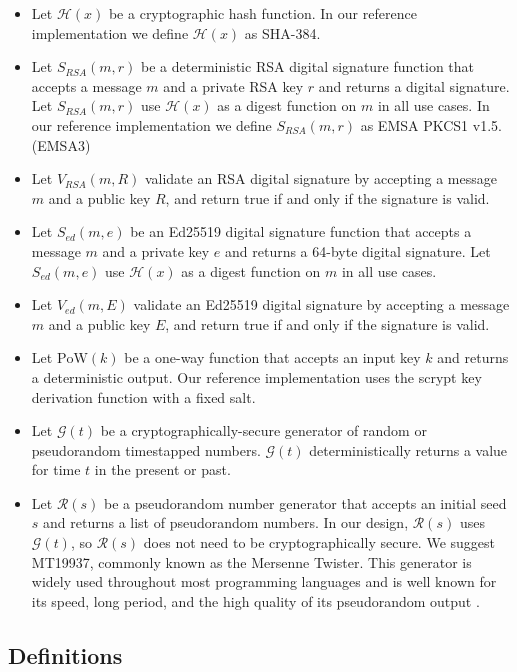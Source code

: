 \documentclass[conference]{IEEEtran}
\begin{document}
\begin{itemize}
	\item Let $ \mathcal{H}(x) $ be a cryptographic hash function. In our reference implementation we define $ \mathcal{H}(x) $ as SHA-384.
	\item Let $ S_{\mathit{RSA}}(m, r) $ be a deterministic RSA digital signature function that accepts a message $ m $ and a private RSA key $ r $ and returns a digital signature. Let $ S_{\mathit{RSA}}(m, r) $ use $ \mathcal{H}(x) $ as a digest function on $ m $ in all use cases. In our reference implementation we define $ S_{\mathit{RSA}}(m, r) $ as EMSA PKCS1 v1.5. (EMSA3)
	\item Let $ V_{\mathit{RSA}}(m, R) $ validate an RSA digital signature by accepting a message $ m $ and a public key $ R $, and return true if and only if the signature is valid.
	\item Let $ S_{\mathit{ed}}(m, e) $ be an Ed25519 digital signature function that accepts a message $ m $ and a private key $ e $ and returns a 64-byte digital signature. Let $ S_{\mathit{ed}}(m, e) $ use $ \mathcal{H}(x) $ as a digest function on $ m $ in all use cases.
	\item Let $ V_{\mathit{ed}}(m, E) $ validate an Ed25519 digital signature by accepting a message $ m $ and a public key $ E $, and return true if and only if the signature is valid.
	\item Let $ \mathrm{PoW}(k) $ be a one-way function that accepts an input key $ k $ and returns a deterministic output. Our reference implementation uses the scrypt \cite{percival2012scrypt} key derivation function with a fixed salt.
	\item Let $ \mathcal{G}(t) $ be a cryptographically-secure generator of random or pseudorandom timestapped numbers. $ \mathcal{G}(t) $ deterministically returns a value for time $ t $ in the present or past.
	\item Let $ \mathcal{R}(s) $ be a pseudorandom number generator that accepts an initial seed $ s $ and returns a list of pseudorandom numbers. In our design, $ \mathcal{R}(s) $ uses $ \mathcal{G}(t) $, so $ \mathcal{R}(s) $ does not need to be cryptographically secure. We suggest MT19937, commonly known as the Mersenne Twister. This generator is widely used throughout most programming languages and is well known for its speed, long period, and the high quality of its pseudorandom output \cite{matsumoto1998mersenne}.
\end{itemize}

\subsection{Definitions}
\end{document}
